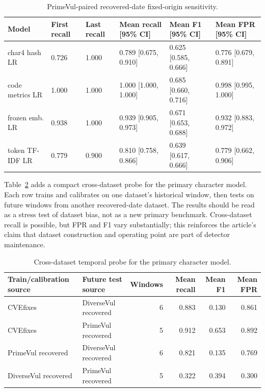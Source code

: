 \documentclass[a4paper,fleqn]{cas-dc}
\begin{document}
\begin{table}
\centering
\caption{PrimeVul-paired recovered-date fixed-origin sensitivity.}
\label{tab:primevul}
\small
\setlength{\tabcolsep}{4pt}
\begin{tabular}{lp{}p{}p{}p{}p{}}
\toprule
Model & First recall & Last recall & Mean recall [95\% CI] & Mean F1 [95\% CI] & Mean FPR [95\% CI] \\
\midrule
char4 hash LR & 0.726 & 1.000 & 0.789 [0.675, 0.910] & 0.625 [0.585, 0.666] & 0.776 [0.679, 0.891] \\
code metrics LR & 1.000 & 1.000 & 1.000 [1.000, 1.000] & 0.685 [0.660, 0.716] & 0.998 [0.995, 1.000] \\
frozen emb. LR & 0.938 & 1.000 & 0.939 [0.905, 0.973] & 0.671 [0.653, 0.688] & 0.932 [0.883, 0.972] \\
token TF-IDF LR & 0.779 & 0.900 & 0.810 [0.758, 0.866] & 0.639 [0.617, 0.666] & 0.779 [0.662, 0.906] \\
\bottomrule
\end{tabular}
\end{table}

Table~\ref{tab:cross-dataset} adds a compact cross-dataset probe for the
primary character model. Each row trains and calibrates on one dataset's
historical window, then tests on future windows from another recovered-date
dataset. The results should be read as a stress test of dataset bias, not as a
new primary benchmark. Cross-dataset recall is possible, but FPR and F1 vary
substantially; this reinforces the article's claim that dataset construction and
operating point are part of detector maintenance.

\begin{table}
\centering
\caption{Cross-dataset temporal probe for the primary character model.}
\label{tab:cross-dataset}
\small
\setlength{\tabcolsep}{5pt}
\begin{tabular}{llrrrr}
\toprule
Train/calibration source & Future test source & Windows & Mean recall & Mean F1 & Mean FPR \\
\midrule
CVEfixes & DiverseVul recovered & 6 & 0.883 & 0.130 & 0.861 \\
CVEfixes & PrimeVul recovered & 5 & 0.912 & 0.653 & 0.892 \\
PrimeVul recovered & DiverseVul recovered & 6 & 0.821 & 0.135 & 0.769 \\
DiverseVul recovered & PrimeVul recovered & 5 & 0.322 & 0.394 & 0.300 \\
\bottomrule
\end{tabular}
\end{table}
\end{document}
